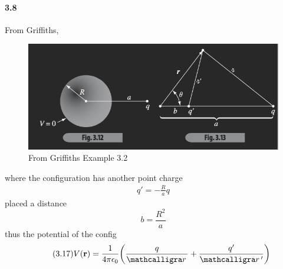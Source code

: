 \documentclass[../main.tex]{subfiles}
\begin{document}
\paragraph{3.8} 
From Griffiths,
\begin{figure}[ht]
    \centering
    \includegraphics[width=0.5\linewidth]{hw3_8.png}
    \caption{From Griffiths Example 3.2}
    \label{fig:3.8}
\end{figure}
where the configuration has another point charge
\begin{align*} \tag{3.15} \label{3.15}
    q' = -\frac{R}{a} q
\end{align*}
placed a distance
\[ \tag{3.16} \label{3.16} b = \frac{R^2}{a} \]
thus the potential of the config\begin{align*} \tag{3.17} \label{3.17}
    V (\vb r) = \ke \qt(
        \frac{q}{\scriptr} + \frac{q'}{\scriptr'}
    )
\end{align*}
\end{document}
